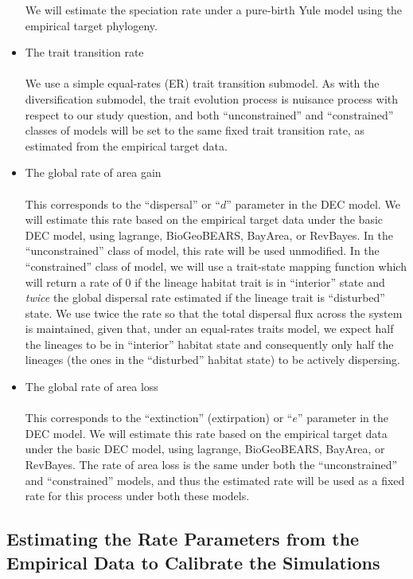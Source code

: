 \documentclass[11pt,openany]{memoir} %
\begin{document}
\begin{itemize}
        We will estimate the speciation rate under a pure-birth Yule model using the empirical target phylogeny.
    \item The trait transition rate \hfill \\
        \\
        We use a simple equal-rates (ER) trait transition submodel.
        As with the diversification submodel, the trait evolution process is nuisance process with respect to our study question, and both ``unconstrained'' and ``constrained'' classes of models will be set to the same fixed trait transition rate, as estimated from the empirical target data.
    \item The global rate of area gain \hfill \\
        \\
        This corresponds to the ``dispersal'' or ``$d$'' parameter in the DEC model.
        We will estimate this rate based on the empirical target data under the basic DEC model, using lagrange, BioGeoBEARS, BayArea, or RevBayes.
        In the ``unconstrained'' class of model, this rate will be used unmodified.
        In the ``constrained'' class of model, we will use a trait-state mapping function which will return a rate of $0$ if the lineage habitat trait is in ``interior'' state and \textit{twice} the global dispersal rate estimated if the lineage trait is ``disturbed'' state.
        We use twice the rate so that the total dispersal flux across the system is maintained, given that, under an equal-rates traits model, we expect half the lineages to be in ``interior'' habitat state and consequently only half the lineages (the ones in the ``disturbed'' habitat state) to be actively dispersing.
    \item The global rate of area loss \hfill \\
        \\
        This corresponds to the ``extinction'' (extirpation) or ``$e$'' parameter in the DEC model.
        We will estimate this rate based on the empirical target data under the basic DEC model, using lagrange, BioGeoBEARS, BayArea, or RevBayes.
        The rate of area loss is the same under both the ``unconstrained'' and ``constrained'' models, and thus the estimated rate will be used as a fixed rate for this process under both these models.

\end{itemize}

\subsection{Estimating the Rate Parameters from the Empirical Data to Calibrate the Simulations}
\end{document}

